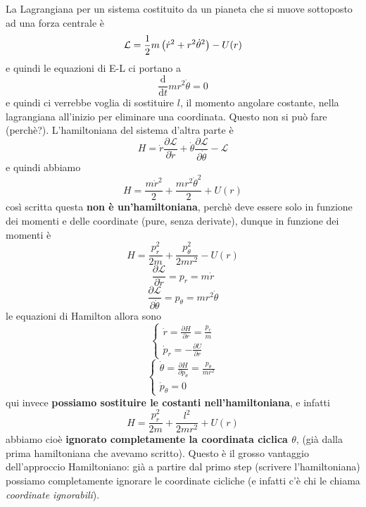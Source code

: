 \documentclass[11pt]{scrartcl}
\newcommand{\dif}{\text{d}}
\begin{document}
	\begin{example}[Pianeti]
		La Lagrangiana per un sistema costituito da un pianeta che si muove sottoposto ad una forza centrale è 
		$$\mathcal{L}=\frac{1}{2} m\left(\dot{r}^2+r^2\dot{\theta}^2\right)-U(r)$$
		e quindi le equazioni di E-L ci portano a 
		$$\frac{\dif}{\dif t}mr^2\dot{\theta}=0$$
		e quindi ci verrebbe voglia di sostituire $l$, il momento angolare costante, nella lagrangiana all'inizio per eliminare una coordinata. Questo non si può fare (perchè?). L'hamiltoniana del sistema d'altra parte è
		$$H=\dot{r}\frac{\partial \mathcal{L}}{\partial \dot{r}}+\dot{\theta}\frac{\partial \mathcal{L}}{\partial \dot{\theta}}-\mathcal{L}$$
		e quindi abbiamo 
		$$H=\frac{m\dot{r}^2}{2}+\frac{mr^2\dot{\theta}^2}{2}+U(r)$$
		così scritta questa \textbf{non è un'hamiltoniana}, perchè deve essere solo in funzione dei momenti e delle coordinate (pure, senza derivate), dunque in funzione dei momenti è
		$$H=\frac{p_r^2}{2m}+\frac{p_\theta^2}{2mr^2}-U(r)$$
		$$\frac{\partial \mathcal{L}}{\partial \dot{r}}=p_r=m\dot{r}$$
		$$\frac{\partial \mathcal{L}}{\partial \dot{\theta}}=p_\theta=mr^2\dot{\theta}$$
		le equazioni di Hamilton allora sono
		$$\begin{cases}
			\dot{r}=\frac{\partial H}{\partial r}=\frac{p_r}{m} \\
			\dot{p}_r=-\frac{\partial U}{\partial r}
		\end{cases}$$
		$$
		\begin{cases}
			\dot{\theta}=\frac{\partial H}{\partial p_\theta}=\frac{p_\theta}{mr^2} \\
			\dot{p}_\theta=0
		\end{cases}
		$$
		qui invece \textbf{possiamo sostituire le costanti nell'hamiltoniana}, e infatti
		$$H=\frac{p_r^2}{2m}+\frac{l^2}{2mr^2}+U(r)$$
		abbiamo cioè \textbf{ignorato completamente la coordinata ciclica $\theta$}, (già dalla prima hamiltoniana che avevamo scritto). Questo è il grosso vantaggio dell'approccio Hamiltoniano: già a partire dal primo step (scrivere l'hamiltoniana) possiamo completamente ignorare le coordinate cicliche (e infatti c'è chi le chiama \textit{coordinate ignorabili}).
	\end{example}
	
\end{document}
